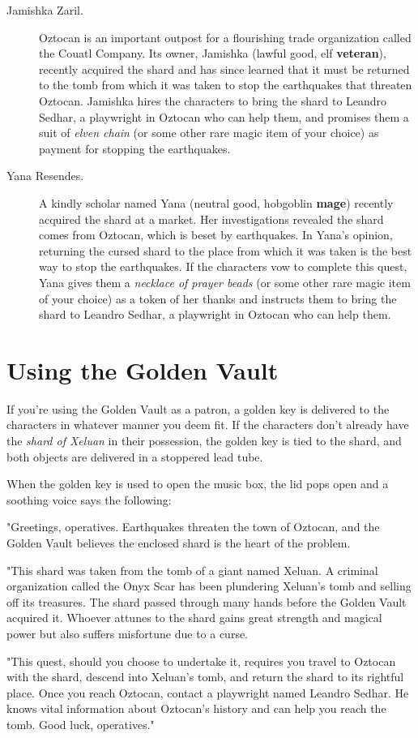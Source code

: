 \documentclass[10pt,a4paper,twoside,bg=print,twocolumn,openany,nodeprecatedcode]{dndbook}
\begin{document}
\begin{description}
\item[Jamishka Zaril.]
Oztocan is an important outpost for a flourishing trade organization called the Couatl Company. Its owner, Jamishka (lawful good, elf \textbf{veteran}), recently acquired the shard and has since learned that it must be returned to the tomb from which it was taken to stop the earthquakes that threaten Oztocan. Jamishka hires the characters to bring the shard to Leandro Sedhar, a playwright in Oztocan who can help them, and promises them a suit of \textit{elven chain} (or some other rare magic item of your choice) as payment for stopping the earthquakes.
\item[Yana Resendes.]
A kindly scholar named Yana (neutral good, hobgoblin \textbf{mage}) recently acquired the shard at a market. Her investigations revealed the shard comes from Oztocan, which is beset by earthquakes. In Yana's opinion, returning the cursed shard to the place from which it was taken is the best way to stop the earthquakes. If the characters vow to complete this quest, Yana gives them a \textit{necklace of prayer beads} (or some other rare magic item of your choice) as a token of her thanks and instructs them to bring the shard to Leandro Sedhar, a playwright in Oztocan who can help them.
\end{description}

\section{Using the Golden Vault}
If you're using the Golden Vault as a patron, a golden key is delivered to the characters in whatever manner you deem fit. If the characters don't already have the \textit{shard of Xeluan} in their possession, the golden key is tied to the shard, and both objects are delivered in a stoppered lead tube.

When the golden key is used to open the music box, the lid pops open and a soothing voice says the following:

\begin{DndReadAloud}{}
"Greetings, operatives. Earthquakes threaten the town of Oztocan, and the Golden Vault believes the enclosed shard is the heart of the problem.

"This shard was taken from the tomb of a giant named Xeluan. A criminal organization called the Onyx Scar has been plundering Xeluan's tomb and selling off its treasures. The shard passed through many hands before the Golden Vault acquired it. Whoever attunes to the shard gains great strength and magical power but also suffers misfortune due to a curse.

"This quest, should you choose to undertake it, requires you travel to Oztocan with the shard, descend into Xeluan's tomb, and return the shard to its rightful place. Once you reach Oztocan, contact a playwright named Leandro Sedhar. He knows vital information about Oztocan's history and can help you reach the tomb. Good luck, operatives."

\end{DndReadAloud}
\end{document}
